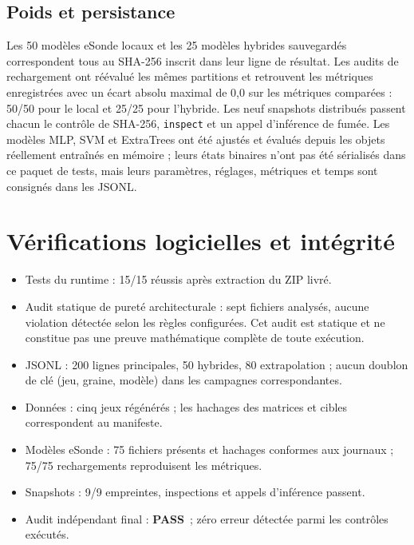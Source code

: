 \documentclass[11pt,a4paper]{article}
\newcommand{\PASS}{\textcolor{green!45!black}{\textbf{PASS}}}
\begin{document}
\subsection{Poids et persistance}
Les 50 modèles eSonde locaux et les 25 modèles hybrides sauvegardés correspondent tous au SHA-256 inscrit dans leur ligne de résultat. Les audits de rechargement ont réévalué les mêmes partitions et retrouvent les métriques enregistrées avec un écart absolu maximal de 0,0 sur les métriques comparées : 50/50 pour le local et 25/25 pour l'hybride. Les neuf snapshots distribués passent chacun le contrôle de SHA-256, \texttt{inspect} et un appel d'inférence de fumée. Les modèles MLP, SVM et ExtraTrees ont été ajustés et évalués depuis les objets réellement entraînés en mémoire ; leurs états binaires n'ont pas été sérialisés dans ce paquet de tests, mais leurs paramètres, réglages, métriques et temps sont consignés dans les JSONL.

\section{Vérifications logicielles et intégrité}
\begin{itemize}
\item Tests du runtime : 15/15 réussis après extraction du ZIP livré.
\item Audit statique de pureté architecturale : sept fichiers analysés, aucune violation détectée selon les règles configurées. Cet audit est statique et ne constitue pas une preuve mathématique complète de toute exécution.
\item JSONL : 200 lignes principales, 50 hybrides, 80 extrapolation ; aucun doublon de clé (jeu, graine, modèle) dans les campagnes correspondantes.
\item Données : cinq jeux régénérés ; les hachages des matrices et cibles correspondent au manifeste.
\item Modèles eSonde : 75 fichiers présents et hachages conformes aux journaux ; 75/75 rechargements reproduisent les métriques.
\item Snapshots : 9/9 empreintes, inspections et appels d'inférence passent.
\item Audit indépendant final : \PASS\ ; zéro erreur détectée parmi les contrôles exécutés.
\end{itemize}
\end{document}
